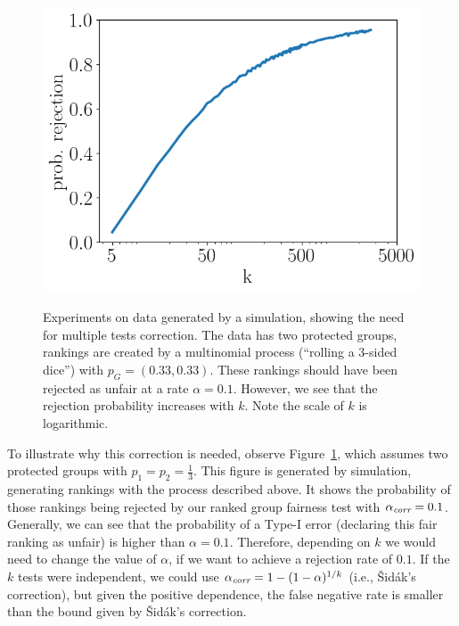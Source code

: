 \begin{figure}[b!]
	\centering
	{\includegraphics[width=.48\textwidth]{pics/failProbPlotMultinom.png}}
	\CaptionMargin
	\caption{Experiments on data generated by a simulation, showing the need for multiple tests correction.
		The data has two protected groups, rankings are created by a multinomial process (``rolling a 3-sided dice'') with $p_G = (0.33, 0.33)$.
		These rankings should have been rejected as unfair at a rate $\alpha = 0.1$.
		However, we see that the rejection probability increases with $k$.
		Note the scale of $k$ is logarithmic.}
	\label{fig:why-adjustment-is-needed-multinomial}
	\vspace{-4mm}
\end{figure}
To illustrate why this correction is needed, observe Figure~\ref{fig:why-adjustment-is-needed-multinomial}, which assumes two protected groups with $p_1=p_2=\frac{1}{3}$.
%
This figure is generated by simulation, generating rankings with the process described above.
%
It shows the probability of those rankings being rejected by our ranked group fairness test with $\alpha_\textit{corr}=0.1$.
%
Generally, we can see that the probability of a Type-I error (declaring this fair ranking as unfair) is higher than $\alpha = 0.1$.
%
Therefore, depending on $k$ we would need to change the value of $\alpha$, if we want to achieve a rejection rate of $0.1$.
%
If the $k$ tests were independent, we could use $\alpha_\textit{corr} = 1 - (1 - \alpha)^{1/k}$ (i.e., {\v S}id{\'a}k's correction), but given the positive dependence, the false negative rate is smaller than the bound given by {\v S}id{\'a}k's correction.

